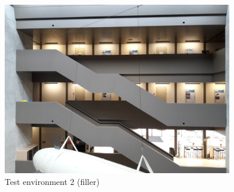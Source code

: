 \begin{figure}[ht]
	\centering
	\includegraphics[width=0.9\textwidth]{3-evaluation/graphics/env2.jpg}
	\caption{Test environment 2 (filler)\label{evaluation:env2}}
\end{figure}